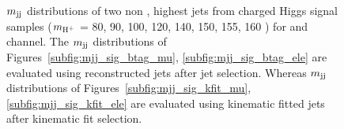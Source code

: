 \begin{figure}
    \centering  
    \vfil
    \caption{$m_\text{jj}$ distributions of two non \PQb, highest \pt jets from charged
        Higgs signal samples ($m_{\text{H}^+}$ = 80, 90, 100, 120, 140, 150, 155, 
        160 \GeV) for \mujets and \ejets channel. The $m_\text{jj}$
        distributions of Figures~\ref{subfig:mjj_sig_btag_mu}, 
        \ref{subfig:mjj_sig_btag_ele} are evaluated using reconstructed jets 
        after \PQb jet selection. Whereas $m_\text{jj}$ distributions of 
	Figures~\ref{subfig:mjj_sig_kfit_mu}, \ref{subfig:mjj_sig_kfit_ele} are evaluated 
	using kinematic fitted jets after kinematic fit selection.} 
    \label{fig:mjjBTagKinFit_Sig}
\end{figure}

